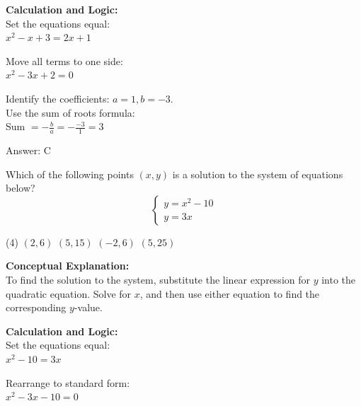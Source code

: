 \documentclass[11pt,paper=a4,answers]{exam}
\begin{document}
\begin{questions}
\begin{solution}
\vspace{20pt}

\textbf{Calculation and Logic:} \\
Set the equations equal: \\
$x^2 - x + 3 = 2x + 1$

\vspace{10pt}

Move all terms to one side: \\
$x^2 - 3x + 2 = 0$

\vspace{10pt}

Identify the coefficients: $a = 1, b = -3$. \\
Use the sum of roots formula: \\
Sum $= -\frac{b}{a} = -\frac{-3}{1} = 3$

\vspace{25pt}

Answer: \colorbox{yellow!100}{C}
\end{solution}


\question
Which of the following points $(x, y)$ is a solution to the system of equations below?
\[ \begin{cases} y = x^2 - 10 \\ y = 3x \end{cases} \]
\begin{tasks}(4)
    \task $(2, 6)$
    \task $(5, 15)$
    \task $(-2, 6)$
    \task $(5, 25)$
\end{tasks}

\begin{solution}
\textbf{Conceptual Explanation:} \\
To find the solution to the system, substitute the linear expression for $y$ into the quadratic equation. Solve for $x$, and then use either equation to find the corresponding $y$-value.

\vspace{20pt}

\textbf{Calculation and Logic:} \\
Set the equations equal: \\
$x^2 - 10 = 3x$

\vspace{10pt}

Rearrange to standard form: \\
$x^2 - 3x - 10 = 0$


\end{solution}
\end{questions}
\end{document}

